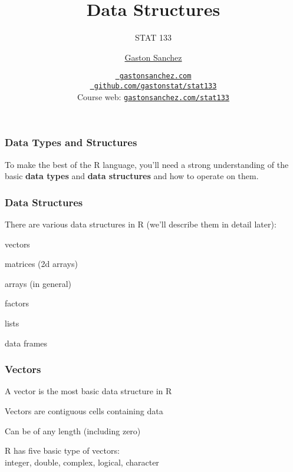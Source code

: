 \documentclass[12pt]{beamer}\usepackage[]{graphicx}\usepackage[]{color}
\title{Data Structures}
\subtitle{STAT 133}
\author{\href{http://www.gastonsanchez.com}{Gaston Sanchez}}
\institute{Department of Statistics, UC{\textendash}Berkeley}
\date{\href{http://www.gastonsanchez.com}{\tt \scriptsize \color{foreground} gastonsanchez.com}
\\[-4pt]
\href{http://github.com/gastonstat/stat133}{\tt \scriptsize \color{foreground} github.com/gastonstat/stat133}
\\[-4pt]
{\scriptsize Course web: \href{http://www.gastonsanchez.com/stat133}{\tt gastonsanchez.com/stat133}}
}
\begin{document}
{
  \frame{
    \titlepage
  } 
}


\begin{frame}
\frametitle{Data Types and Structures}

To make the best of the R language, you'll need a strong understanding of the basic \textbf{data types} and \textbf{data structures} and how to operate on them.

\end{frame}


\begin{frame}
\frametitle{Data Structures}

There are various data structures in R (we'll describe them in detail later):

\bi
  \item vectors
  \item matrices (2d arrays)
  \item arrays (in general)
  \item factors
  \item lists
  \item data frames
\ei

\end{frame}


\begin{frame}
\begin{center}
\Huge{}
\end{center}
\end{frame}


\begin{frame}
\frametitle{Vectors}

\bi
  \item A vector is the most basic data structure in R
  \item Vectors are contiguous cells containing data
  \item Can be of any length (including zero)
  \item R has five basic type of vectors: \\
  integer, double, complex, logical, character
\ei

\end{frame}
\end{document}
